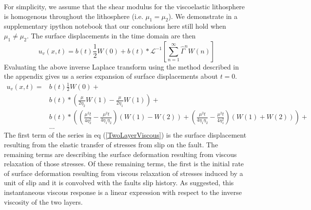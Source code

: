 \documentclass[12pt]{article}
\begin{document}
For simplicity, we assume that the shear modulus for the viscoelastic
lithosphere is homogenous throughout the lithosphere (i.e. $\mu_1 =
\mu_2$).  We demonstrate in a supplementary ipython notebook that our
conclusions here still hold when $\mu_1 \neq \mu_2$.  The surface
displacements in the time domain are then 
\begin{equation}
 u_v(x,t) = b(t)\frac{1}{2}W(0) + 
            b(t)\ast\mathcal{L}^{-1}\left[\sum_{n=1}^\infty\hat{\Gamma}^{n}W(n)\right]
\end{equation}
Evaluating the above inverse Laplace transform using the method
described in the appendix gives us a series expansion of surface
displacements about $t=0$.
\begin{align}\label{TwoLayerViscous}
  u_v(x,t) = &b(t)\frac{1}{2}W(0) +\nonumber\\
             &b(t)\ast\left(\frac{\mu}{2\eta_2}W(1) - \frac{\mu}{2\eta_1}W(1)\right) +\nonumber\\
             &b(t)\ast\left(\left(\frac{\mu^2t}{4\eta_2^2} -
                  \frac{\mu^2t}{4\eta_1\eta_2}\right) \left(W(1) - W(2)\right) +
                  \left(\frac{\mu^2t}{4\eta_1\eta_2} - \frac{\mu^2t}{4\eta_1^2}\right)
                  \left(W(1) + W(2)\right)\right) + \nonumber\\ 
             &\dots
\end{align} 
The first term of the series in eq (\ref{TwoLayerViscous}) is the
surface displacement resulting from the elastic transfer of stresses
from slip on the fault.  The remaining terms are describing the
surface deformation resulting from viscous relaxation of those
stresses. Of these remaining terms, the first is the initial rate of
surface deformation resulting from viscous relaxation of stresses
induced by a unit of slip and it is convolved with the faults slip
history.  As suggested, this instantaneous viscous response is a
linear expression with respect to the inverse viscosity of the two
layers.
\end{document}
